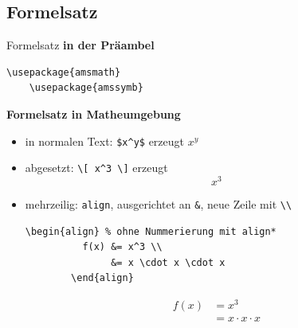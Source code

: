 \subsection{Formelsatz}

\begin{Frame}[fragile]{Formelsatz}
  \textbf{\color{maincolor}in der Präambel}
  \begin{lstlisting}[gobble=4]
    \usepackage{amsmath}
    \usepackage{amssymb}
  \end{lstlisting}

  \textbf{\color{maincolor}Formelsatz in Matheumgebung}
  \begin{itemize}
    \item in normalen Text: \lstinline-$x^y$- erzeugt $x^y$
    \item abgesetzt: \lstinline-\[ x^3 \]- erzeugt
      \[ x^3 \]
    \item mehrzeilig: \lstinline-align-, ausgerichtet an \lstinline-&-, neue Zeile mit \lstinline-\\- 
      \begin{lstlisting}[gobble=8]
        \begin{align} % ohne Nummerierung mit align*
          f(x) &= x^3 \\
               &= x \cdot x \cdot x
        \end{align}
      \end{lstlisting}
      \begin{align}
        f(x) &= x^3 \\
             &= x \cdot x \cdot x
      \end{align}
  \end{itemize}
\end{Frame}

